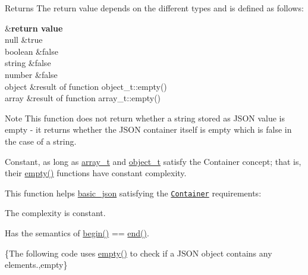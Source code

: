 \begin{DoxyReturn}{Returns}
The return value depends on the different types and is defined as follows\+: \begin{TabularC}{2}
\hline
{}&{\bf return value  }\\
null &{\ttfamily true} \\
boolean &{\ttfamily false} \\
string &{\ttfamily false} \\
number &{\ttfamily false} \\
object &result of function {\ttfamily object\+\_\+t\+::empty()} \\
array &result of function {\ttfamily array\+\_\+t\+::empty()} \\
\end{TabularC}

\end{DoxyReturn}
\begin{DoxyNote}{Note}
This function does not return whether a string stored as J\+S\+O\+N value is empty -\/ it returns whether the J\+S\+O\+N container itself is empty which is false in the case of a string.
\end{DoxyNote}
Constant, as long as \hyperlink{classnlohmann_1_1basic__json_ab00b882d39306d663c23dab110f5cae0}{array\+\_\+t} and \hyperlink{classnlohmann_1_1basic__json_a0ac9894c9de8dc551cf2e5f1c605537f}{object\+\_\+t} satisfy the Container concept; that is, their {\ttfamily \hyperlink{classnlohmann_1_1basic__json_a90239431815c94b0a334f7f4c55eb859}{empty()}} functions have constant complexity.

This function helps {\ttfamily \hyperlink{classnlohmann_1_1basic__json}{basic\+\_\+json}} satisfying the \href{http://en.cppreference.com/w/cpp/concept/Container}{\tt Container} requirements\+:
\begin{DoxyItemize}
\item The complexity is constant.
\item Has the semantics of {\ttfamily \hyperlink{classnlohmann_1_1basic__json_ad4e381c54039607be08d7af41a1f6ad1}{begin()} == \hyperlink{classnlohmann_1_1basic__json_a12ccf14d39ddae52f6c7e126105a230b}{end()}}.
\end{DoxyItemize}

\{The following code uses {\ttfamily \hyperlink{classnlohmann_1_1basic__json_a90239431815c94b0a334f7f4c55eb859}{empty()}} to check if a J\+S\+O\+N object contains any elements.,empty\}

